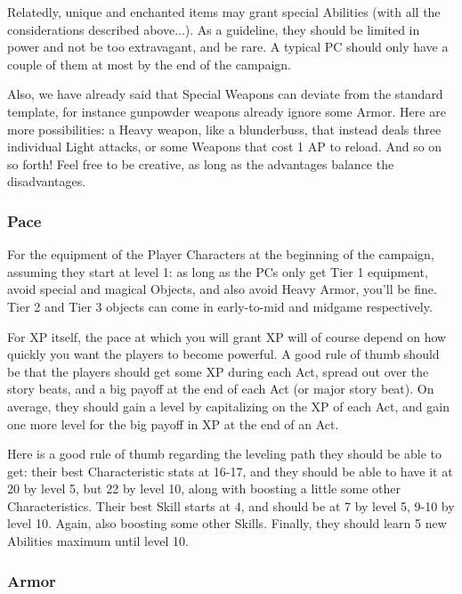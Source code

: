 Relatedly, unique and enchanted items may grant special Abilities (with all the considerations described above...). As a guideline, they should be limited in power and not be too extravagant, and be rare. A typical PC should only have a couple of them at most by the end of the campaign.

Also, we have already said that Special Weapons can deviate from the standard template, for instance gunpowder weapons already ignore some Armor. Here are more possibilities: a Heavy weapon, like a blunderbuss, that instead deals three individual Light attacks, or some Weapons that cost 1 AP to reload. And so on so forth! Feel free to be creative, as long as the advantages balance the disadvantages.


\subsubsection{Pace}

\label{leveling_balancing}

For the equipment of the Player Characters at the beginning of the campaign, assuming they start at level 1: as long as the PCs only get Tier 1 equipment, avoid special and magical Objects, and also avoid Heavy Armor, you'll be fine. Tier 2 and Tier 3 objects can come in early-to-mid and midgame respectively.

For XP itself, the pace at which you will grant XP will of course depend on how quickly you want the players to become powerful. A good rule of thumb should be that the players should get some XP during each Act, spread out over the story beats, and a big payoff at the end of each Act (or major story beat). On average, they should gain a level by capitalizing on the XP of each Act, and gain one more level for the big payoff in XP at the end of an Act.

Here is a good rule of thumb regarding the leveling path they should be able to get: their best Characteristic stats at 16-17, and they should be able to have it at 20 by level 5, but 22 by level 10, along with boosting a little some other Characteristics. Their best Skill starts at 4, and should be at 7 by level 5, 9-10 by level 10. Again, also boosting some other Skills. Finally, they should learn 5 new Abilities maximum until level 10.

\subsubsection{Armor}

